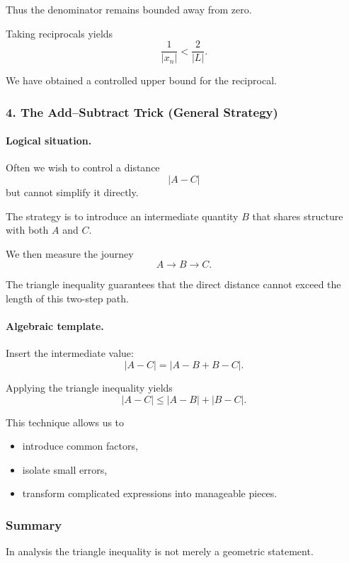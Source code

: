 Thus the denominator remains bounded away from zero.

Taking reciprocals yields
\[
\frac{1}{|x_n|}
<
\frac{2}{|L|}.
\]

We have obtained a controlled upper bound for the reciprocal.

\bigskip

\subsubsection*{4. The Add--Subtract Trick (General Strategy)}

\paragraph{Logical situation.}

Often we wish to control a distance
\[
|A - C|
\]
but cannot simplify it directly.

The strategy is to introduce an intermediate quantity $B$ that shares
structure with both $A$ and $C$.

We then measure the journey
\[
A \to B \to C.
\]

The triangle inequality guarantees that the direct distance cannot
exceed the length of this two-step path.

\paragraph{Algebraic template.}

Insert the intermediate value:
\[
|A - C|
=
|A - B + B - C|.
\]

Applying the triangle inequality yields
\[
|A - C|
\le
|A - B| + |B - C|.
\]

This technique allows us to

\begin{itemize}
\item introduce common factors,
\item isolate small errors,
\item transform complicated expressions into manageable pieces.
\end{itemize}

\bigskip

\subsubsection*{Summary}

In analysis the triangle inequality is not merely a geometric
statement.

